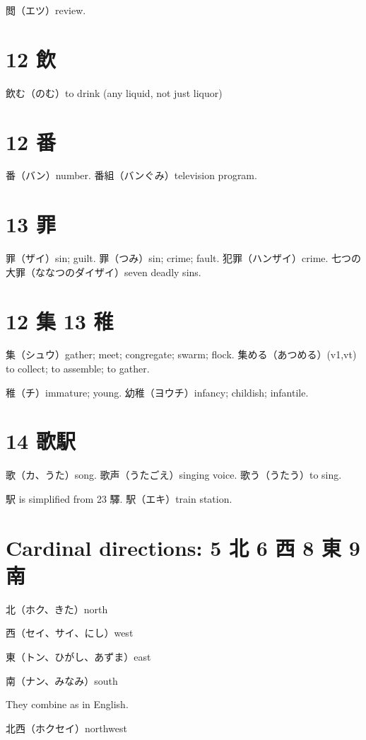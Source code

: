 閲（エツ）review.

\section{12 飲}

飲む（のむ）to drink (any liquid, not just liquor)

\section{12 番}

番（バン）number.
番組（バンぐみ）television program.

\section{13 罪}

罪（ザイ）sin; guilt.
罪（つみ）sin; crime; fault.
犯罪（ハンザイ）crime.
七つの大罪（ななつのダイザイ）seven deadly sins.

\section{12 集 13 稚}

集（シュウ）gather; meet; congregate; swarm; flock.
集める（あつめる）(v1,vt) to collect; to assemble; to gather.

稚（チ）immature; young.
幼稚（ヨウチ）infancy; childish; infantile.

\section{14 歌駅}

歌（カ、うた）song.
歌声（うたごえ）singing voice.
歌う（うたう）to sing.

駅 is simplified from 23 驛.
駅（エキ）train station.

\section{Cardinal directions: 5 北 6 西 8 東 9 南}

北（ホク、きた）north

西（セイ、サイ、にし）west

東（トン、ひがし、あずま）east

南（ナン、みなみ）south

They combine as in English.

北西（ホクセイ）northwest

